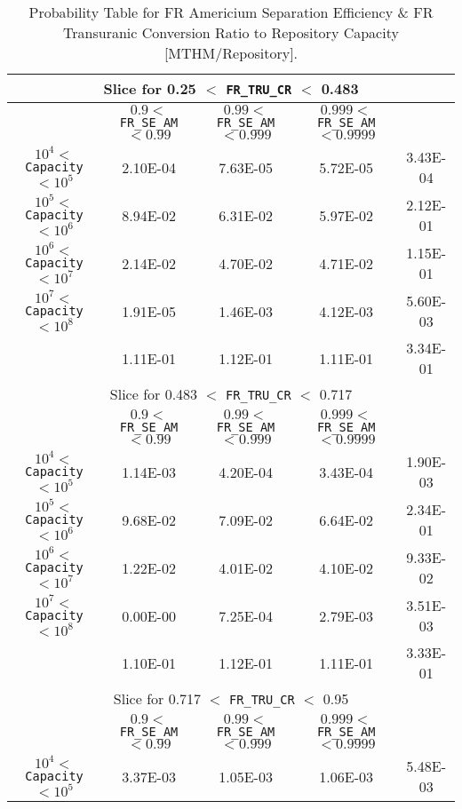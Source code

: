 \begin{center}
\begin{table}[htbp]
\caption{Probability Table for FR Americium Separation Efficiency \& FR Transuranic Conversion Ratio to Repository Capacity [MTHM/Repository].}
\label{FR_SE_AM_and_FR_TRU_CR_to_Capacity_with_IJK433_prop}
\tiny
\begin{center}
\begin{tabular}{|c||c|c|c||c|}
\hline
\multicolumn{5}{|c|}{Slice for 0.25 $<$ \texttt{FR\_TRU\_CR} $<$ 0.483}\\
\hline
&$0.9 <$ \texttt{FR\_SE\_AM} $< 0.99$&$0.99 <$ \texttt{FR\_SE\_AM} $< 0.999$&$0.999 <$ \texttt{FR\_SE\_AM} $< 0.9999$&\\
\hline
$10^4 <$ \texttt{Capacity} $< 10^5$&2.10E-04&7.63E-05&5.72E-05&3.43E-04\\
\hline
$10^5 <$ \texttt{Capacity} $< 10^6$&8.94E-02&6.31E-02&5.97E-02&2.12E-01\\
\hline
$10^6 <$ \texttt{Capacity} $< 10^7$&2.14E-02&4.70E-02&4.71E-02&1.15E-01\\
\hline
$10^7 <$ \texttt{Capacity} $< 10^8$&1.91E-05&1.46E-03&4.12E-03&5.60E-03\\
\hline
&1.11E-01&1.12E-01&1.11E-01&3.34E-01\\
\hline
\hline
\multicolumn{5}{|c|}{Slice for 0.483 $<$ \texttt{FR\_TRU\_CR} $<$ 0.717}\\
\hline
&$0.9 <$ \texttt{FR\_SE\_AM} $< 0.99$&$0.99 <$ \texttt{FR\_SE\_AM} $< 0.999$&$0.999 <$ \texttt{FR\_SE\_AM} $< 0.9999$&\\
\hline
$10^4 <$ \texttt{Capacity} $< 10^5$&1.14E-03&4.20E-04&3.43E-04&1.90E-03\\
\hline
$10^5 <$ \texttt{Capacity} $< 10^6$&9.68E-02&7.09E-02&6.64E-02&2.34E-01\\
\hline
$10^6 <$ \texttt{Capacity} $< 10^7$&1.22E-02&4.01E-02&4.10E-02&9.33E-02\\
\hline
$10^7 <$ \texttt{Capacity} $< 10^8$&0.00E-00&7.25E-04&2.79E-03&3.51E-03\\
\hline
&1.10E-01&1.12E-01&1.11E-01&3.33E-01\\
\hline
\hline
\multicolumn{5}{|c|}{Slice for 0.717 $<$ \texttt{FR\_TRU\_CR} $<$ 0.95}\\
\hline
&$0.9 <$ \texttt{FR\_SE\_AM} $< 0.99$&$0.99 <$ \texttt{FR\_SE\_AM} $< 0.999$&$0.999 <$ \texttt{FR\_SE\_AM} $< 0.9999$&\\
\hline
$10^4 <$ \texttt{Capacity} $< 10^5$&3.37E-03&1.05E-03&1.06E-03&5.48E-03\\

\end{tabular}
\end{center}
\end{table}
\end{center}
